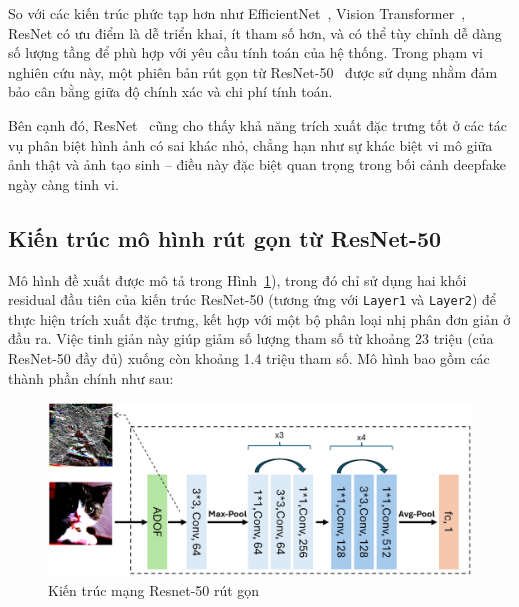 So với các kiến trúc phức tạp hơn như EfficientNet~\cite{zhong2024patchcraftexploringtexturepatch}, Vision Transformer~\cite{dosovitskiy2020image}, ResNet có ưu điểm là dễ triển khai, ít tham số hơn, và có thể tùy chỉnh dễ dàng số lượng tầng để phù hợp với yêu cầu tính toán của hệ thống. Trong phạm vi nghiên cứu này, một phiên bản rút gọn từ ResNet-50~\cite{He2015DeepRL} được sử dụng nhằm đảm bảo cân bằng giữa độ chính xác và chi phí tính toán.

Bên cạnh đó, ResNet~\cite{He2015DeepRL} cũng cho thấy khả năng trích xuất đặc trưng tốt ở các tác vụ phân biệt hình ảnh có sai khác nhỏ, chẳng hạn như sự khác biệt vi mô giữa ảnh thật và ảnh tạo sinh – điều này đặc biệt quan trọng trong bối cảnh \gls{deepfake} ngày càng tinh vi.

\subsection{Kiến trúc mô hình rút gọn từ ResNet-50}
\label{sec:kien_truc_mo_hinh_rut_gon_tu_resnet_50}
Mô hình đề xuất được mô tả trong Hình~\ref{fig:figure_model_architecture}), trong đó chỉ sử dụng hai khối residual đầu tiên của kiến trúc ResNet-50 (tương ứng với \texttt{Layer1} và \texttt{Layer2}) để thực hiện trích xuất đặc trưng, kết hợp với một bộ phân loại nhị phân đơn giản ở đầu ra. Việc tinh giản này giúp giảm số lượng tham số từ khoảng 23 triệu (của ResNet-50 đầy đủ) xuống còn khoảng 1.4 triệu tham số. Mô hình bao gồm các thành phần chính như sau:
%
\begin{figure}[h!]
	\centering
	\includegraphics[width=1.0\linewidth]{Images/figure_model_architecture.png}
	\begin{minipage}{1.0\linewidth}
		\vspace{5mm}
		\caption{Kiến trúc mạng Resnet-50 rút gọn}
		\label{fig:figure_model_architecture}
	\end{minipage}
\end{figure}
%
%

